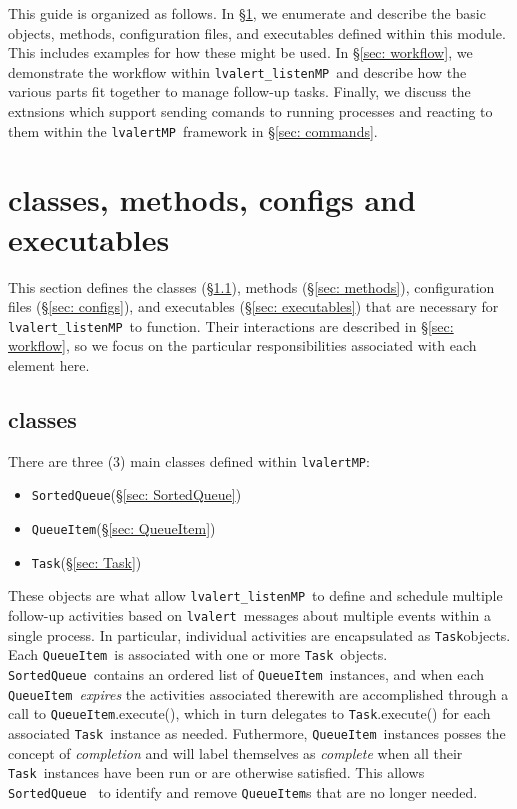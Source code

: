\documentclass{article}
\newcommand{\alert}{\texttt{lvalert}}
\newcommand{\lvalertMP}{\texttt{lvalertMP}}
\newcommand{\lvalertListenMP}{\texttt{lvalert\_listenMP}}
\newcommand{\SortedQueue}{\texttt{SortedQueue}}
\newcommand{\QueueItem}{\texttt{QueueItem}}
\newcommand{\Task}{\texttt{Task}}
\begin{document}
This guide is organized as follows. In \S\ref{sec: classes, methods, configs and executables}, we enumerate and describe the basic objects, methods, configuration files, and executables defined within this module. 
This includes examples for how these might be used.
In \S\ref{sec: workflow}, we demonstrate the workflow within \lvalertListenMP~and describe how the various parts fit together to manage follow-up tasks.
Finally, we discuss the extnsions which support sending comands to running processes and reacting to them within the \lvalertMP~framework in \S\ref{sec: commands}.


\section{classes, methods, configs and executables}
\label{sec: classes, methods, configs and executables}

This section defines the classes (\S\ref{sec: classes}), methods (\S\ref{sec: methods}), configuration files (\S\ref{sec: configs}), and executables (\S\ref{sec: executables}) that are necessary for \lvalertListenMP~to function. 
Their interactions are described in \S\ref{sec: workflow}, so we focus on the particular responsibilities associated with each element here.


\subsection{classes}
\label{sec: classes}

There are three (3) main classes defined within \lvalertMP:
\begin{itemize}
    \item{\SortedQueue (\S\ref{sec: SortedQueue})}
    \item{\QueueItem (\S\ref{sec: QueueItem})}
    \item{\Task (\S\ref{sec: Task})}
\end{itemize}
These objects are what allow \lvalertListenMP~to define and schedule multiple follow-up activities based on \alert~messages about multiple events within a single process.
In particular, individual activities are encapsulated as \Task objects.
Each \QueueItem~is associated with one or more \Task~objects.
\SortedQueue~contains an ordered list of \QueueItem~instances, and when each \QueueItem~\textit{expires} the activities associated therewith are accomplished through a call to \QueueItem.execute(), which in turn delegates to \Task.execute() for each associated \Task~instance as needed.
Futhermore, \QueueItem~instances posses the concept of \textit{completion} and will label themselves as \textit{complete} when all their \Task~instances have been run or are otherwise satisfied.
This allows \SortedQueue~ to identify and remove {\QueueItem}s that are no longer needed.
\end{document}
